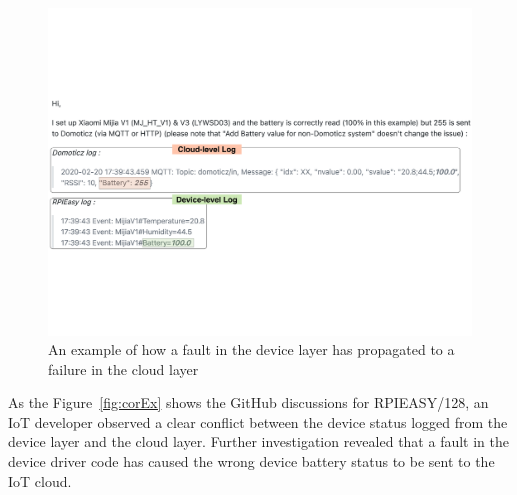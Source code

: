  \begin{figure}%
  \centering
   \includegraphics[width=\linewidth]{imgs/corEx}
  \caption{An example of how a fault in the device layer has propagated to a failure in the cloud layer}
  \label{fig:corEx}
\end{figure}


As the Figure~\autoref{fig:corEx} shows the GitHub discussions for RPIEASY/128, an IoT developer observed a clear conflict between the device status logged from the device layer and the cloud layer. Further investigation revealed that a fault in the device driver code has caused the wrong device battery status to be sent to the IoT cloud.

 \begin{table}[htbp]
\caption{Bug Categories with Positive Correlation}
\begin{center}
\label{tab:correlations}
\end{center}
\end{table}


